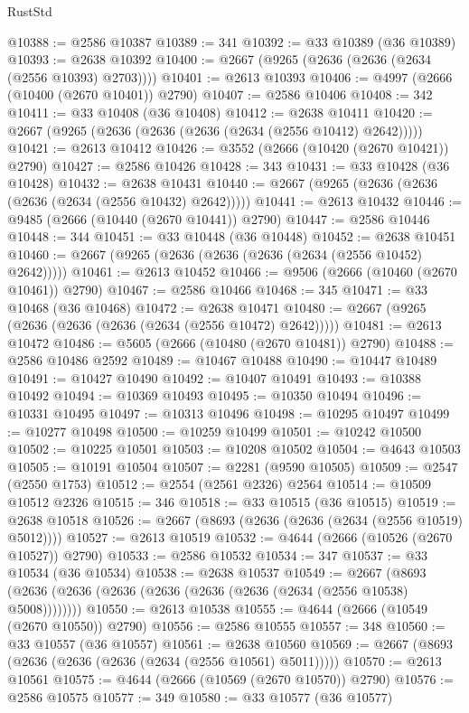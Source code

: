 \begin{lexlean}{RustStd}
\begin{coremodule}
@10388 := @2586 @10387
@10389 := 341
@10392 := @33 @10389 (@36 @10389)
@10393 := @2638 @10392
@10400 := @2667 (@9265 (@2636 (@2636 (@2634 (@2556 @10393) @2703))))
@10401 := @2613 @10393
@10406 := @4997 (@2666 (@10400 (@2670 @10401)) @2790)
@10407 := @2586 @10406
@10408 := 342
@10411 := @33 @10408 (@36 @10408)
@10412 := @2638 @10411
@10420 := @2667 (@9265 (@2636 (@2636 (@2636 (@2634 (@2556 @10412) @2642)))))
@10421 := @2613 @10412
@10426 := @3552 (@2666 (@10420 (@2670 @10421)) @2790)
@10427 := @2586 @10426
@10428 := 343
@10431 := @33 @10428 (@36 @10428)
@10432 := @2638 @10431
@10440 := @2667 (@9265 (@2636 (@2636 (@2636 (@2634 (@2556 @10432) @2642)))))
@10441 := @2613 @10432
@10446 := @9485 (@2666 (@10440 (@2670 @10441)) @2790)
@10447 := @2586 @10446
@10448 := 344
@10451 := @33 @10448 (@36 @10448)
@10452 := @2638 @10451
@10460 := @2667 (@9265 (@2636 (@2636 (@2636 (@2634 (@2556 @10452) @2642)))))
@10461 := @2613 @10452
@10466 := @9506 (@2666 (@10460 (@2670 @10461)) @2790)
@10467 := @2586 @10466
@10468 := 345
@10471 := @33 @10468 (@36 @10468)
@10472 := @2638 @10471
@10480 := @2667 (@9265 (@2636 (@2636 (@2636 (@2634 (@2556 @10472) @2642)))))
@10481 := @2613 @10472
@10486 := @5605 (@2666 (@10480 (@2670 @10481)) @2790)
@10488 := @2586 @10486 @2592
@10489 := @10467 @10488
@10490 := @10447 @10489
@10491 := @10427 @10490
@10492 := @10407 @10491
@10493 := @10388 @10492
@10494 := @10369 @10493
@10495 := @10350 @10494
@10496 := @10331 @10495
@10497 := @10313 @10496
@10498 := @10295 @10497
@10499 := @10277 @10498
@10500 := @10259 @10499
@10501 := @10242 @10500
@10502 := @10225 @10501
@10503 := @10208 @10502
@10504 := @4643 @10503
@10505 := @10191 @10504
@10507 := @2281 (@9590 @10505)
@10509 := @2547 (@2550 @1753)
@10512 := @2554 (@2561 @2326) @2564
@10514 := @10509 @10512 @2326
@10515 := 346
@10518 := @33 @10515 (@36 @10515)
@10519 := @2638 @10518
@10526 := @2667 (@8693 (@2636 (@2636 (@2634 (@2556 @10519) @5012))))
@10527 := @2613 @10519
@10532 := @4644 (@2666 (@10526 (@2670 @10527)) @2790)
@10533 := @2586 @10532
@10534 := 347
@10537 := @33 @10534 (@36 @10534)
@10538 := @2638 @10537
@10549 := @2667 (@8693 (@2636 (@2636 (@2636 (@2636 (@2636 (@2636 (@2634 (@2556 @10538) @5008))))))))
@10550 := @2613 @10538
@10555 := @4644 (@2666 (@10549 (@2670 @10550)) @2790)
@10556 := @2586 @10555
@10557 := 348
@10560 := @33 @10557 (@36 @10557)
@10561 := @2638 @10560
@10569 := @2667 (@8693 (@2636 (@2636 (@2636 (@2634 (@2556 @10561) @5011)))))
@10570 := @2613 @10561
@10575 := @4644 (@2666 (@10569 (@2670 @10570)) @2790)
@10576 := @2586 @10575
@10577 := 349
@10580 := @33 @10577 (@36 @10577)

\end{coremodule}
\end{lexlean}
